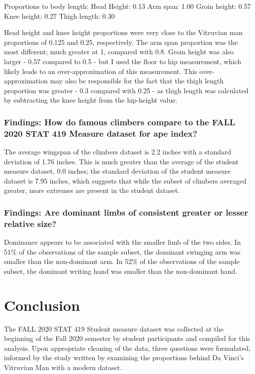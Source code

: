 \documentclass[]{article}
\begin{document}
Proportions to body length: Head Height: 0.13 Arm span: 1.00 Groin
height: 0.57 Knee height: 0.27 Thigh length: 0.30

Head height and knee height proportions were very close to the Vitruvian
man proportions of 0.125 and 0.25, respectively. The arm span proportion
was the most different; much greater at 1, compared with 0.8. Groin
height was also larger - 0.57 compared to 0.5 - but I used the floor to
hip measurement, which likely leads to an over-approximation of this
measurement. This over-approximation may also be responsible for the
fact that the thigh length proportion was greater - 0.3 compared with
0.25 - as thigh length was calculated by subtracting the knee height
from the hip-height value.

\subsubsection{Findings: How do famous climbers compare to the FALL 2020 STAT 419 Measure dataset for ape index?}
\label{sec:findRQ2}

The average wingspan of the climbers dataset is 2.2 inches with a
standard deviation of 1.76 inches. This is much greater than the average
of the student measure dataset, 0.0 inches; the standard deviation of
the student measure dataset is 7.95 inches, which suggests that while
the subset of climbers averaged greater, more extremes are present in
the student dataset.

\subsubsection{Findings: Are dominant limbs of consistent greater or lesser relative size?}
\label{sec:findRQ3}

Dominance appears to be associated with the smaller limb of the two
sides. In 51\% of the observations of the sample subset, the dominant
swinging arm was smaller than the non-dominant arm. In 52\% of the
observations of the sample subset, the dominant writing hand was smaller
than the non-dominant hand.

\section{Conclusion}
\label{sec:conclusion}

\indent The FALL 2020 STAT 419 Student measure dataset was collected at
the beginning of the Fall 2020 semester by student participants and
compiled for this analysis. Upon appropriate cleaning of the data, three
questions were formulated, informed by the study written by
\citet{Thomas:2020} examining the proportions behind Da Vinci's
Vitruvian Man with a modern dataset.
\end{document}
